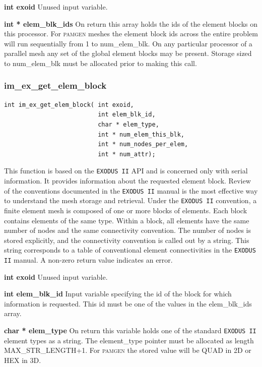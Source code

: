 {\setlength{\parindent}{0pt}
 \textbf{int exoid} Unused input variable.}

{\setlength{\parindent}{0pt}
 \textbf{int * elem\_blk\_ids}  On return this array holds the ids of the element blocks on this processor. For \textsc{pamgen} meshes the element block ids across the entire problem will run sequentially from 1 to num\_elem\_blk. On any particular processor of a parallel mesh any set of the global element blocks may be present. Storage sized to num\_elem\_blk must be allocated prior to making this call.}

\subsubsection{im\_ex\_get\_elem\_block}
{\ttfamily  \begin{verbatim}
int im_ex_get_elem_block( int exoid,
                          int elem_blk_id,
                          char * elem_type,
                          int * num_elem_this_blk,
                          int * num_nodes_per_elem,
                          int * num_attr);
\end{verbatim}}
This function is based on the \texttt{EXODUS II} API and is concerned only with serial information. It provides information about the requested element block.  Review of the conventions documented in the \texttt{EXODUS II} manual is the most effective way to understand the mesh storage and retrieval. Under the \texttt{EXODUS II} convention, a finite element mesh is composed of one or more blocks of elements. Each block contains elements of the same type. Within a block, all elements have the same number of nodes and the same connectivity convention. The number of nodes is stored explicitly, and the connectivity convention is called out by a string. This string corresponds to a table of conventional element connectivities in the \texttt{EXODUS II} manual. A non-zero return value indicates an error.

{\setlength{\parindent}{0pt}
 \textbf{int exoid} Unused input variable.}

{\setlength{\parindent}{0pt}
 \textbf{int elem\_blk\_id}  Input variable specifying the id of the block for which information is requested. This id must be one of the values in the elem\_blk\_ids array.}

{\setlength{\parindent}{0pt}
 \textbf{char * elem\_type}  On return this variable holds one of the standard \texttt{EXODUS II} element types as a string. The element\_type pointer must be allocated as length MAX\_STR\_LENGTH+1. For \textsc{pamgen} the stored value will be QUAD in 2D or HEX in 3D.}
 
